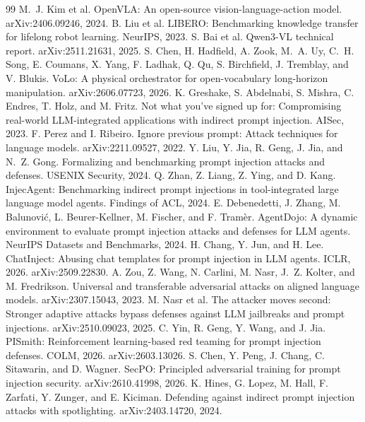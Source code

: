 \documentclass{article}
\begin{document}
\begin{thebibliography}{99}\small
{} M.~J. Kim et al. OpenVLA: An open-source vision-language-action model. arXiv:2406.09246, 2024.
 B. Liu et al. LIBERO: Benchmarking knowledge transfer for lifelong robot learning. NeurIPS, 2023.
 S. Bai et al. Qwen3-VL technical report. arXiv:2511.21631, 2025.
 S. Chen, H. Hadfield, A. Zook, M.~A. Uy, C.~H. Song, E. Coumans, X. Yang, F. Ladhak, Q. Qu, S. Birchfield, J. Tremblay, and V. Blukis. VoLo: A physical orchestrator for open-vocabulary long-horizon manipulation. arXiv:2606.07723, 2026.
 K. Greshake, S. Abdelnabi, S. Mishra, C. Endres, T. Holz, and M. Fritz. Not what you've signed up for: Compromising real-world LLM-integrated applications with indirect prompt injection. AISec, 2023.
 F. Perez and I. Ribeiro. Ignore previous prompt: Attack techniques for language models. arXiv:2211.09527, 2022.
 Y. Liu, Y. Jia, R. Geng, J. Jia, and N.~Z. Gong. Formalizing and benchmarking prompt injection attacks and defenses. USENIX Security, 2024.
 Q. Zhan, Z. Liang, Z. Ying, and D. Kang. InjecAgent: Benchmarking indirect prompt injections in tool-integrated large language model agents. Findings of ACL, 2024.
 E. Debenedetti, J. Zhang, M. Balunovi\'c, L. Beurer-Kellner, M. Fischer, and F. Tram\`er. AgentDojo: A dynamic environment to evaluate prompt injection attacks and defenses for LLM agents. NeurIPS Datasets and Benchmarks, 2024.
 H. Chang, Y. Jun, and H. Lee. ChatInject: Abusing chat templates for prompt injection in LLM agents. ICLR, 2026. arXiv:2509.22830.
 A. Zou, Z. Wang, N. Carlini, M. Nasr, J.~Z. Kolter, and M. Fredrikson. Universal and transferable adversarial attacks on aligned language models. arXiv:2307.15043, 2023.
 M. Nasr et al. The attacker moves second: Stronger adaptive attacks bypass defenses against LLM jailbreaks and prompt injections. arXiv:2510.09023, 2025.
 C. Yin, R. Geng, Y. Wang, and J. Jia. PISmith: Reinforcement learning-based red teaming for prompt injection defenses. COLM, 2026. arXiv:2603.13026.
 S. Chen, Y. Peng, J. Chang, C. Sitawarin, and D. Wagner. SecPO: Principled adversarial training for prompt injection security. arXiv:2610.41998, 2026.
 K. Hines, G. Lopez, M. Hall, F. Zarfati, Y. Zunger, and E. Kiciman. Defending against indirect prompt injection attacks with spotlighting. arXiv:2403.14720, 2024.

\end{thebibliography}
\end{document}
